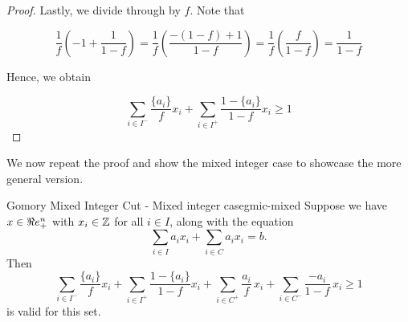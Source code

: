 \begin{proof}
Lastly, we divide through by $f$.  Note that

\begin{equation*}
\frac{1}{f} \left(-1+\frac{1}{1-f}\right) = 
\frac{1}{f} \left(\frac{-(1-f) + 1}{1-f}\right) = 
\frac{1}{f} \left(\frac{f}{1-f}\right) = 
\frac{1}{1-f} 
\end{equation*}

Hence, we obtain

\begin{equation*}
\label{eq:gmic-end}
\sum_{i \in I^{-}} \frac{\{a_i\}}{f} x_i + \sum_{i \in I^+} \frac{1-\{a_i\}}{1-f}x_i  \geq 1
\end{equation*}


\end{proof}


We now repeat the proof and show the mixed integer case to showcase the more general version.

\begin{theorem}{Gomory Mixed Integer Cut - Mixed integer case}{gmic-mixed}
Suppose we have $x \in \Re e^n_+$ with $x_i \in {\mathbb{Z}}$ for all $ i \in I$, along with the equation
\begin{equation}
\sum_{i \in I} a_{i}x_{i} + \sum_{i \in C} a_{i}x_{i } = b.
\end{equation}
Then
\begin{equation}
\label{eq:gmic}
\sum_{i \in I^{-}} \frac{\{a_i\}}{f} x_i + \sum_{i \in I^+} \frac{1-\{a_i\}}{1-f}x_i + 
\sum_{i \in C^+} \frac{a_i}{f}\, x_i   + \sum_{i \in C^-}\frac{-a_i}{1-f}\,x_i \geq 1
\end{equation}
is valid for this set.
\end{theorem}


